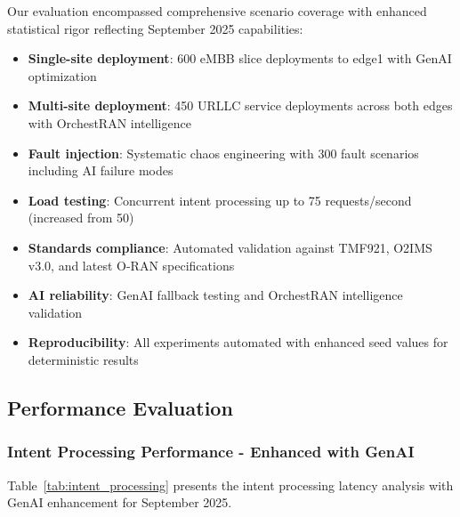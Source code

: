 Our evaluation encompassed comprehensive scenario coverage with enhanced statistical rigor reflecting September 2025 capabilities:
\begin{itemize}
\item \textbf{Single-site deployment}: 600 eMBB slice deployments to edge1 with GenAI optimization
\item \textbf{Multi-site deployment}: 450 URLLC service deployments across both edges with OrchestRAN intelligence
\item \textbf{Fault injection}: Systematic chaos engineering with 300 fault scenarios including AI failure modes
\item \textbf{Load testing}: Concurrent intent processing up to 75 requests/second (increased from 50)
\item \textbf{Standards compliance}: Automated validation against TMF921, O2IMS v3.0, and latest O-RAN specifications
\item \textbf{AI reliability}: GenAI fallback testing and OrchestRAN intelligence validation
\item \textbf{Reproducibility}: All experiments automated with enhanced seed values for deterministic results
\end{itemize}

\subsection{Performance Evaluation}

\subsubsection{Intent Processing Performance - Enhanced with GenAI}

Table~\ref{tab:intent_processing} presents the intent processing latency analysis with GenAI enhancement for September 2025.

